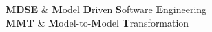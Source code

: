 \documentclass[11pt, a4paper, oneside]{Thesis} %
\begin{document}
{\textbf{MDSE} & \textbf{M}odel \textbf{D}riven \textbf{S}oftware
\textbf{E}ngineering  \\

\textbf{MMT} & \textbf{M}odel-to-\textbf{M}odel \textbf{T}ransformation  \\

}











\end{document}
